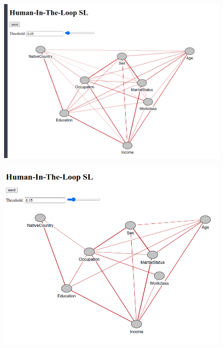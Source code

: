\documentclass{beamer}
\begin{document}
\begin{frame}
	\begin{figure}
		\centering
		\includegraphics[scale=0.35]{1.png}
	\end{figure}
\end{frame}
\begin{frame}
	\begin{figure}
		\centering
		\includegraphics[scale=0.35]{2.png}
	\end{figure}
\end{frame}
\end{document}
